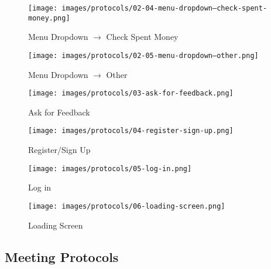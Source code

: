 \documentclass[a4paper, 12pt]{article}
\begin{document}
\begin{figure} [htbp]
  \begin{center}
    \texttt{[image: images/protocols/02-04-menu-dropdown--check-spent-money.png]}
  \end{center}
  \caption{Menu Dropdown $\rightarrow$ Check Spent Money}
\end{figure}

\begin{figure} [htbp]
  \begin{center}
    \texttt{[image: images/protocols/02-05-menu-dropdown--other.png]}
  \end{center}
  \caption{Menu Dropdown $\rightarrow$ Other}
\end{figure}

\begin{figure} [htbp]
  \begin{center}
    \texttt{[image: images/protocols/03-ask-for-feedback.png]}
  \end{center}
  \caption{Ask for Feedback}
\end{figure}

\begin{figure} [htbp]
  \begin{center}
    \texttt{[image: images/protocols/04-register-sign-up.png]}
  \end{center}
  \caption{Register/Sign Up}
\end{figure}

\begin{figure} [htbp]
  \begin{center}
    \texttt{[image: images/protocols/05-log-in.png]}
  \end{center}
  \caption{Log in}
\end{figure}

\begin{figure} [htbp]
  \begin{center}
    \texttt{[image: images/protocols/06-loading-screen.png]}
  \end{center}
  \caption{Loading Screen}
\end{figure}

\newpage
\subsection{Meeting Protocols}
\end{document}
